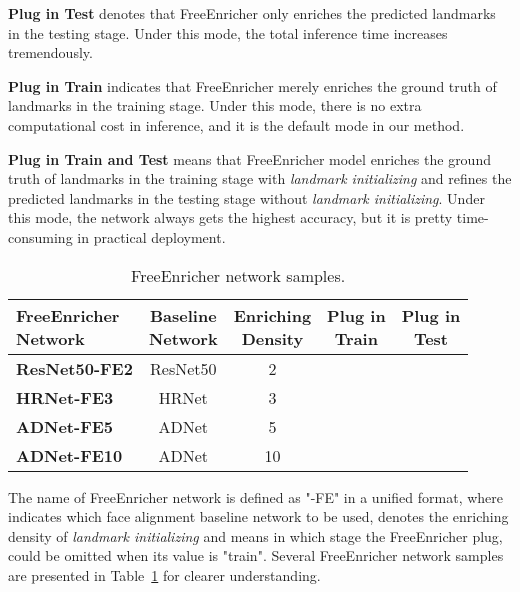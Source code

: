 \documentclass[letterpaper]{article} \usepackage{aaai23}  \usepackage{times}  \usepackage{helvet}  \usepackage{courier}  \usepackage[hyphens]{url}  \usepackage{graphicx} \urlstyle{rm} \def\UrlFont{\rm}  \usepackage{natbib}  \usepackage{caption} \frenchspacing  \setlength{\pdfpagewidth}{8.5in}  \setlength{\pdfpageheight}{11in}  \usepackage{algorithm}
\newcommand{\tickYes}{\ding{51}}
\newcommand{\tickNo}{\ding{55}}
\begin{document}
\vspace{5pt}
\noindent\textbf{Plug in Test}
denotes that FreeEnricher only enriches the predicted landmarks in the testing stage.
Under this mode, the total inference time increases tremendously.

\vspace{5pt}
\noindent\textbf{Plug in Train}
indicates that FreeEnricher merely enriches the ground truth of landmarks in the training stage.
Under this mode, there is no extra computational cost in inference, and it is the default mode in our method.

\vspace{5pt}
\noindent\textbf{Plug in Train and Test} means that FreeEnricher model enriches the ground truth of landmarks in the training stage with \emph{landmark initializing} and refines the predicted landmarks in the testing stage without \emph{landmark initializing}.
Under this mode, the network always gets the highest accuracy, but it is pretty time-consuming in practical deployment.

\begin{table}[htbp]
\begin{center}
\scriptsize
    \begin{tabular}{lcccc}
    \hline
\makecell{FreeEnricher \\ Network} & \makecell{Baseline \\ Network} & \makecell{Enriching \\ Density} & \makecell{Plug in \\ Train} & \makecell{Plug in \\ Test} \\
    \hline
    \textbf{ResNet50-FE2} & ResNet50 & 2 & \tickYes & \tickNo \\
    \textbf{HRNet-FE3} & HRNet & 3 & \tickNo & \tickYes \\
    \textbf{ADNet-FE5} & ADNet & 5 & \tickYes & \tickNo \\
    \textbf{ADNet-FE10} & ADNet & 10 & \tickYes & \tickYes \\
    \hline
    \end{tabular}
\end{center}
\caption{
FreeEnricher network samples. }
\label{table:network_naming}
\end{table}

The name of FreeEnricher network is defined as "-FE" in a unified format, where  indicates which face alignment baseline network to be used,  denotes the enriching density of \emph{landmark initializing} and  means in which stage the FreeEnricher plug,  could be omitted when its value is "train".
Several FreeEnricher network samples are presented in Table~\ref{table:network_naming} for clearer understanding.
\end{document}
